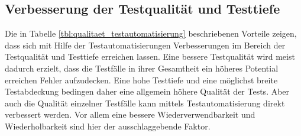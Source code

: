 \subsection{Verbesserung der Testqualität und Testtiefe}
\label{sec:verbesserung_der_testqualität_und_testtiefe}
Die in Tabelle \ref{tbl:qualitaet_testautomatisierung} beschriebenen Vorteile zeigen, dass sich mit Hilfe der Testautomatisierungen Verbesserungen im Bereich der Testqualität und Testtiefe erreichen lassen. Eine bessere Testqualität wird meist dadurch erzielt, dass die Testfälle in ihrer Gesamtheit ein höheres Potential erreichen Fehler aufzudecken. Eine hohe Testtiefe und eine möglichst breite Testabdeckung bedingen daher eine allgemein höhere Qualität der Tests. Aber auch die Qualität einzelner Testfälle kann mittels Testautomatisierung direkt verbessert werden. Vor allem eine bessere Wiederverwendbarkeit und Wiederholbarkeit sind hier der ausschlaggebende Faktor.

